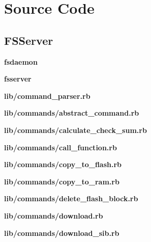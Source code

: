 \chapter{Source Code}
\label{appendix:D}

\section{FSServer}
\textbf{fsdaemon}

\textbf{fsserver}

\textbf{lib/command\_parser.rb}

\textbf{lib/commands/abstract\_command.rb}

\textbf{lib/commands/calculate\_check\_sum.rb}

\textbf{lib/commands/call\_function.rb}

\textbf{lib/commands/copy\_to\_flash.rb}

\textbf{lib/commands/copy\_to\_ram.rb}

\textbf{lib/commands/delete\_flash\_block.rb}

\textbf{lib/commands/download.rb}

\textbf{lib/commands/download\_sib.rb}

